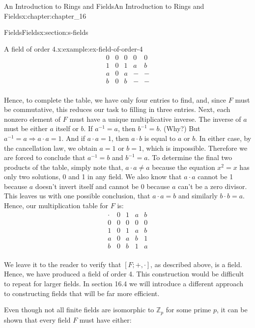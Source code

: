 \documentclass[oneside,10pt,]{book}
\numberwithin{equation}{section}
\begin{document}
\begin{chapterptx}{An Introduction to Rings and Fields}{}{An Introduction to Rings and Fields}{}{}{x:chapter:chapter_16}
\begin{sectionptx}{Fields}{}{Fields}{}{}{x:section:s-fields}
\begin{example}{A field of order 4.}{x:example:ex-field-of-order-4}
\begin{equation*}
\begin{array}{c|cccc}
0 & 0 & 0 & 0 & 0 \\
1 & 0 & 1 & a & b \\
a & 0 & a & - & - \\
b & 0 & b & - & - \\
\end{array}
\end{equation*}
%
\par
Hence, to complete the table, we have only four entries to find, and, since \(F\) must be commutative, this reduces our task to filling in three entries. Next, each nonzero element of \(F\) must have a unique multiplicative inverse. The inverse of \(a\) must be either \(a\) itself or \(b\). If \(a^{-1} = a\), then \(b^{-1}=b\). (Why?) But  \(a^{-1} = a \Rightarrow  a \cdot  a = 1\). And if \(a \cdot  a = 1\), then \(a \cdot  b\) is equal to \(a\) or \(b\).  In either case, by the cancellation law, we obtain \(a = 1\) or \(b = 1\), which is impossible. Therefore we are forced to conclude that \(a^{-1} = b\) and \(b^{-1} = a\). To determine the final two products of the table, simply note that, \(a \cdot  a \neq  a\) because the equation \(x^2=x\) has only two solutions, 0 and 1 in any field. We also know that \(a\cdot a\) cannot be 1 because \(a\) doesn't invert itself and cannot be 0 because \(a\) can't be a zero divisor. This leaves us with one possible conclusion, that  \(a \cdot  a = b\) and similarly \(b \cdot  b = a\).  Hence, our multiplication table for \(F\) is:%
\begin{equation*}
\begin{array}{c|cccc}
\cdot & 0 & 1 & a & b \\
\hline
0 & 0 & 0 & 0 & 0 \\
1 & 0 & 1 & a & b \\
a & 0 & a & b & 1 \\
b & 0 & b & 1 & a \\
\end{array}
\end{equation*}
%
\par
We leave it to the reader to verify that \([F; +, \cdot ]\), as described above, is a field. Hence, we have produced a field of order 4. This construction would be difficult to repeat for larger fields.  In section 16.4 we will introduce a different approach to constructing fields that will be far more efficient.%
\end{example}
Even though not all finite fields are isomorphic to \(\mathbb{Z}_p\) for some prime \(p\), it can be shown that every field \(F\) must have either:%
\begin{itemize}[label=\textbullet]

\end{itemize}
\end{sectionptx}
\end{chapterptx}
\end{document}
